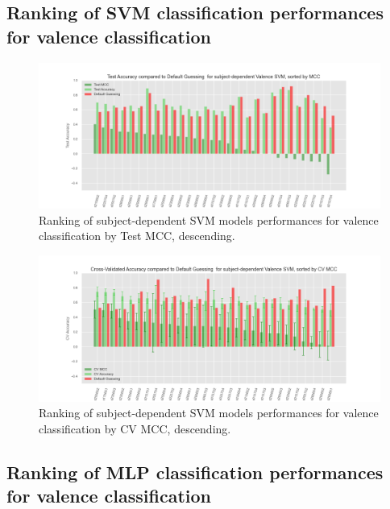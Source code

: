 \subsection{Ranking of SVM classification performances for valence classification}
\label{sec:appendix_A4.3}

\begin{figure}[!htb]
\includegraphics[width=16cm]{img/appendix/final_experiment/test_acc_mcc_valence_svm.png}
\centering
\caption{Ranking of subject-dependent SVM models performances for valence classification by Test MCC, descending.}\label{fig:test_acc_mcc_valence_svm}
\end{figure}

\begin{figure}[!htb]
\includegraphics[width=16cm]{img/appendix/final_experiment/test_cv_acc_mcc_valence_svm.png}
\centering
\caption{Ranking of subject-dependent SVM models performances for valence classification by CV MCC, descending.}\label{fig:test_cv_acc_mcc_valence_svm}
\end{figure}

\subsection{Ranking of MLP classification performances for valence classification}
\label{sec:appendix_A4.4}

